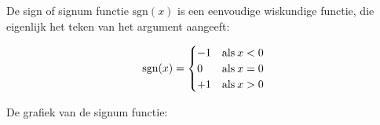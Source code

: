 De sign of signum functie $\textrm{sgn}(x)$ is een eenvoudige wiskundige
functie, die eigenlijk het teken van het argument aangeeft:

\begin{equation*}
\textrm{sgn}(x)=\begin{cases}
-1 & \textrm{als}\:x<0\\
0 & \textrm{\textrm{als}}\:x=0\\
+1 & \textrm{\textrm{als}}\:x>0
\end{cases}
\end{equation*}

De grafiek van de signum functie:

